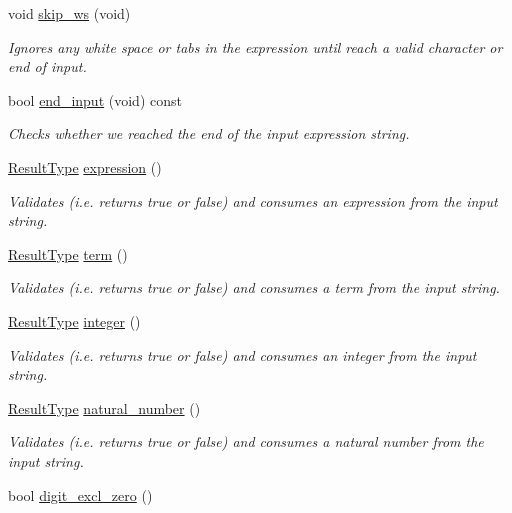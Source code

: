 \begin{DoxyCompactItemize}
void \hyperlink{classParser_a35da81bd369bab816b71418736184d5d}{skip\+\_\+ws} (void)
\begin{DoxyCompactList}\small\item\em Ignores any white space or tabs in the expression until reach a valid character or end of input. \end{DoxyCompactList}\item 
bool \hyperlink{classParser_a0bc1de21b7ed31471b72abb94ab7aba9}{end\+\_\+input} (void) const
\begin{DoxyCompactList}\small\item\em Checks whether we reached the end of the input expression string. \end{DoxyCompactList}\item 
\hyperlink{structParser_1_1ResultType}{Result\+Type} \hyperlink{classParser_ab39d3a821509bfe5fdb2d9d481ae92e6}{expression} ()
\begin{DoxyCompactList}\small\item\em Validates (i.\+e. returns true or false) and consumes an expression from the input string. \end{DoxyCompactList}\item 
\hyperlink{structParser_1_1ResultType}{Result\+Type} \hyperlink{classParser_a82f4cbee572a5b8305368820525603bd}{term} ()
\begin{DoxyCompactList}\small\item\em Validates (i.\+e. returns true or false) and consumes a term from the input string. \end{DoxyCompactList}\item 
\hyperlink{structParser_1_1ResultType}{Result\+Type} \hyperlink{classParser_ab6b91c4e4b8bacb7d0eefca5ae9ffce6}{integer} ()
\begin{DoxyCompactList}\small\item\em Validates (i.\+e. returns true or false) and consumes an integer from the input string. \end{DoxyCompactList}\item 
\hyperlink{structParser_1_1ResultType}{Result\+Type} \hyperlink{classParser_a18974ec32c22bb2f19f3499986de6ada}{natural\+\_\+number} ()
\begin{DoxyCompactList}\small\item\em Validates (i.\+e. returns true or false) and consumes a natural number from the input string. \end{DoxyCompactList}\item 
bool \hyperlink{classParser_ac1522aacdb7de926636be0ca1067b915}{digit\+\_\+excl\+\_\+zero} ()

\end{DoxyCompactItemize}

